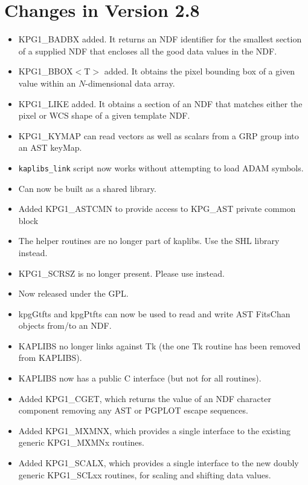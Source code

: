 \section{Changes in Version 2.8}
\begin{itemize}

\item KPG1\_BADBX added. It returns an NDF identifier for the smallest section
      of a supplied NDF that encloses all the good data values in the NDF.
\item KPG1\_BBOX$<$T$>$ added. It obtains the pixel bounding box of a given
     value within an $N$-dimensional data array.
\item KPG1\_LIKE added. It obtains a section of an NDF that matches either
      the pixel or WCS shape of a given template NDF.
\item KPG1\_KYMAP can read vectors as well as scalars from a GRP
      group into an AST keyMap.
\item {\tt kaplibs\_link} script now works without attempting to load ADAM
      symbols.
\item Can now be built as a shared library.
\item Added KPG1\_ASTCMN to provide access to KPG\_AST private common block
\item The  helper routines are no longer part of kaplibs.
      Use the SHL library instead.
\item KPG1\_SCRSZ is no longer present. Please use
       instead.
\item Now released under the GPL.
\item kpgGtfts and kpgPtfts can now be used to read and write
      AST FitsChan objects from/to an NDF.
\item KAPLIBS no longer links against Tk (the one Tk routine has been
      removed from KAPLIBS).
\item KAPLIBS now has a public C interface (but not for all routines).
\item Added KPG1\_CGET, which returns the value of an NDF character
      component removing any AST or PGPLOT escape sequences.
\item Added KPG1\_MXMNX, which provides a single interface to the
      existing generic KPG1\_MXMNx routines.
\item Added KPG1\_SCALX, which provides a single interface to the
      new doubly generic KPG1\_SCLxx routines, for scaling
      and shifting data values.
\end{itemize}

